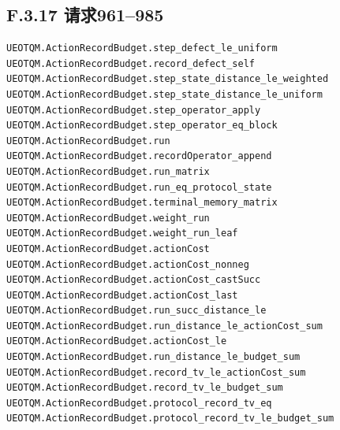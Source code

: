 \documentclass[
  11pt,
  oneside]{book}
\begin{document}
\hypertarget{f.3.17-ux8bf7ux6c42961985}{%
\subsection{F.3.17 请求961--985}\label{f.3.17-ux8bf7ux6c42961985}}

\begin{Verbatim}[breaklines,breakanywhere,fontsize=\scriptsize]
UEOTQM.ActionRecordBudget.step_defect_le_uniform
UEOTQM.ActionRecordBudget.record_defect_self
UEOTQM.ActionRecordBudget.step_state_distance_le_weighted
UEOTQM.ActionRecordBudget.step_state_distance_le_uniform
UEOTQM.ActionRecordBudget.step_operator_apply
UEOTQM.ActionRecordBudget.step_operator_eq_block
UEOTQM.ActionRecordBudget.run
UEOTQM.ActionRecordBudget.recordOperator_append
UEOTQM.ActionRecordBudget.run_matrix
UEOTQM.ActionRecordBudget.run_eq_protocol_state
UEOTQM.ActionRecordBudget.terminal_memory_matrix
UEOTQM.ActionRecordBudget.weight_run
UEOTQM.ActionRecordBudget.weight_run_leaf
UEOTQM.ActionRecordBudget.actionCost
UEOTQM.ActionRecordBudget.actionCost_nonneg
UEOTQM.ActionRecordBudget.actionCost_castSucc
UEOTQM.ActionRecordBudget.actionCost_last
UEOTQM.ActionRecordBudget.run_succ_distance_le
UEOTQM.ActionRecordBudget.run_distance_le_actionCost_sum
UEOTQM.ActionRecordBudget.actionCost_le
UEOTQM.ActionRecordBudget.run_distance_le_budget_sum
UEOTQM.ActionRecordBudget.record_tv_le_actionCost_sum
UEOTQM.ActionRecordBudget.record_tv_le_budget_sum
UEOTQM.ActionRecordBudget.protocol_record_tv_eq
UEOTQM.ActionRecordBudget.protocol_record_tv_le_budget_sum
\end{Verbatim}

\backmatter
\end{document}
